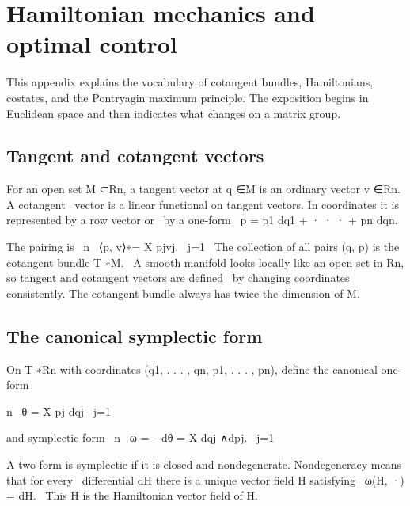 \chapter{Hamiltonian mechanics and optimal control}
This appendix explains the vocabulary of cotangent bundles, Hamiltonians, costates, and the Pontryagin maximum principle. The exposition begins in Euclidean space and then indicates what changes on a matrix group.


\section{Tangent and cotangent vectors}

\begin{displaytext}
For an open set M ⊂Rn, a tangent vector at q ∈M is an ordinary vector v ∈Rn. A cotangent \
vector is a linear functional on tangent vectors. In coordinates it is represented by a row vector or \
by a one-form \
p = p1 dq1 + · · · + pn dqn.
\end{displaytext}

\begin{displaytext}
The pairing is \
n \
⟨p, v⟩∗= X pjvj. \
j=1 \
The collection of all pairs (q, p) is the cotangent bundle T ∗M. \
A smooth manifold looks locally like an open set in Rn, so tangent and cotangent vectors are defined \
by changing coordinates consistently. The cotangent bundle always has twice the dimension of M.
\end{displaytext}

\section{The canonical symplectic form}

On T ∗Rn with coordinates (q1, . . . , qn, p1, . . . , pn), define the canonical one-form


\begin{displaytext}
n \
θ = X pj dqj \
j=1
\end{displaytext}

\begin{displaytext}
and symplectic form \
n \
ω = −dθ = X dqj ∧dpj. \
j=1
\end{displaytext}

\begin{displaytext}
A two-form is symplectic if it is closed and nondegenerate. Nondegeneracy means that for every \
differential dH there is a unique vector field H satisfying \
ω(H, ·) = dH. \
This H is the Hamiltonian vector field of H.
\end{displaytext}

